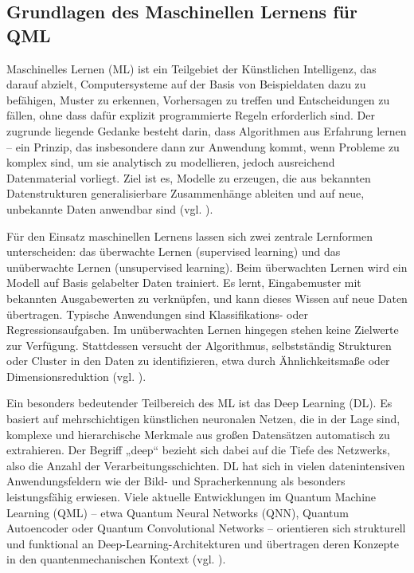 \subsection{Grundlagen des Maschinellen Lernens für QML}
Maschinelles Lernen (ML) ist ein Teilgebiet der Künstlichen Intelligenz, das darauf abzielt, Computersysteme auf der Basis von Beispieldaten dazu zu befähigen, Muster zu erkennen, Vorhersagen zu treffen und Entscheidungen zu fällen, ohne dass dafür explizit programmierte Regeln erforderlich sind. Der zugrunde liegende Gedanke besteht darin, dass Algorithmen aus Erfahrung lernen – ein Prinzip, das insbesondere dann zur Anwendung kommt, wenn Probleme zu komplex sind, um sie analytisch zu modellieren, jedoch ausreichend Datenmaterial vorliegt. Ziel ist es, Modelle zu erzeugen, die aus bekannten Datenstrukturen generalisierbare Zusammenhänge ableiten und auf neue, unbekannte Daten anwendbar sind (vgl. \cite{alpaydin_introduction_2020}).

Für den Einsatz maschinellen Lernens lassen sich zwei zentrale Lernformen unterscheiden: das überwachte Lernen (supervised learning) und das unüberwachte Lernen (unsupervised learning). Beim überwachten Lernen wird ein Modell auf Basis gelabelter Daten trainiert. Es lernt, Eingabemuster mit bekannten Ausgabewerten zu verknüpfen, und kann dieses Wissen auf neue Daten übertragen. Typische Anwendungen sind Klassifikations- oder Regressionsaufgaben. Im unüberwachten Lernen hingegen stehen keine Zielwerte zur Verfügung. Stattdessen versucht der Algorithmus, selbstständig Strukturen oder Cluster in den Daten zu identifizieren, etwa durch Ähnlichkeitsmaße oder Dimensionsreduktion (vgl. \cite{ertel_grundkurs_2025}).

Ein besonders bedeutender Teilbereich des ML ist das Deep Learning (DL). Es basiert auf mehrschichtigen künstlichen neuronalen Netzen, die in der Lage sind, komplexe und hierarchische Merkmale aus großen Datensätzen automatisch zu extrahieren. Der Begriff „deep“ bezieht sich dabei auf die Tiefe des Netzwerks, also die Anzahl der Verarbeitungsschichten. DL hat sich in vielen datenintensiven Anwendungsfeldern wie der Bild- und Spracherkennung als besonders leistungsfähig erwiesen. Viele aktuelle Entwicklungen im Quantum Machine Learning (QML) – etwa Quantum Neural Networks (QNN), Quantum Autoencoder oder Quantum Convolutional Networks – orientieren sich strukturell und funktional an Deep-Learning-Architekturen und übertragen deren Konzepte in den quantenmechanischen Kontext (vgl. \cite{ertel_grundkurs_2025}).

